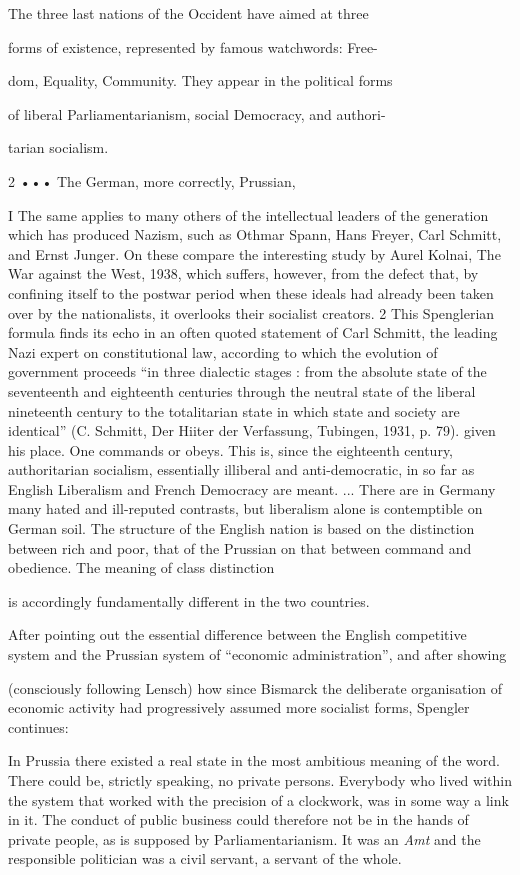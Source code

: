 \documentclass[11pt,openany]{book}
\begin{document}
The three last nations of the Occident have aimed at three

forms of existence, represented by famous watchwords: Free-

dom, Equality, Community. They appear in the political forms

of liberal Parliamentarianism, social Democracy, and authori-

tarian socialism.

2 ••• The German, more correctly, Prussian,

I The same applies to many others of the intellectual leaders of the generation which has produced Nazism, such as Othmar Spann, Hans Freyer, Carl Schmitt, and Ernst Junger. On these compare the interesting study by Aurel Kolnai, The War against the West, 1938, which suffers, however, from the defect that, by confining itself to the postwar period when these ideals had already been taken over by the nationalists, it overlooks their socialist creators. 2 This Spenglerian formula finds its echo in an often quoted statement of Carl Schmitt, the leading Nazi expert on constitutional law, according to which the evolution of government proceeds ``in three dialectic stages : from the absolute state of the seventeenth and eighteenth centuries through the neutral state of the liberal nineteenth century to the totalitarian state in which state and society are identical'' (C. Schmitt, Der Hiiter der Verfassung, Tubingen, 1931, p. 79). given his place. One commands or obeys. This is, since the eighteenth century, authoritarian socialism, essentially illiberal and anti-democratic, in so far as English Liberalism and French Democracy are meant. ... There are in Germany many hated and ill-reputed contrasts, but liberalism alone is contemptible on German soil. The structure of the English nation is based on the distinction between rich and poor, that of the Prussian on that between command and obedience. The meaning of class distinction

is accordingly fundamentally different in the two countries.

After pointing out the essential difference between the English competitive system and the Prussian system of ``economic administration'', and after showing

(consciously following Lensch) how since Bismarck the deliberate organisation of economic activity had progressively assumed more socialist forms, Spengler continues:

In Prussia there existed a real state in the most ambitious meaning of the word. There could be, strictly speaking, no private persons. Everybody who lived within the system that worked with the precision of a clockwork, was in some way a link in it. The conduct of public business could therefore not be in the hands of private people, as is supposed by Parliamentarianism. It was an \emph{Amt} and the responsible politician was a civil servant, a servant of the whole.
\end{document}
